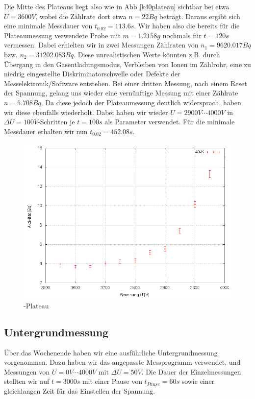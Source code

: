 Die Mitte des Plateaus liegt also wie in Abb \ref{k40plateau} sichtbar bei etwa $U = 3600V$, wobei die Zählrate dort etwa $n = 22 Bq$ beträgt. Daraus ergibt sich eine minimale Messdauer von $t_{0.02} = 113.6 s$. Wir haben also die bereits für die Plateaumessung verwendete Probe mit $m = 1.2158g$ nochmals für $t = 120s$ vermessen. Dabei erhielten wir in zwei Messungen Zählraten von $n_1 = 9620.017 Bq$ bzw. $n_2 = 31 202.083 Bq$. Diese unrealistischen Werte könnten z.B. durch Übergang in den Gasentladungsmodus, Verbleiben von Ionen im Zählrohr, eine zu niedrig eingestellte Diskriminatorschwelle oder Defekte der Messelektronik/Software entstehen. Bei einer dritten Messung, nach einem Reset der Spannung, gelang uns wieder eine vernünftige Messung mit einer Zählrate $n = 5.708 Bq$. Da diese jedoch der Plateaumessung deutlich widersprach, haben wir diese ebenfalls wiederholt. Dabei haben wir wieder $U = 2900V \cdots 4000V$ in $\Delta U = 100 V$-Schritten je $t=100s$ als Parameter verwendet. 
Für die minimale Messdauer erhalten wir nun $t_{0.02} = 452.08 s$.

\begin{figure}[H]
 \centering \includegraphics[width = 0.99\linewidth]{Messwerte/plots/K40_plateau2.png}
 \caption{-Plateau}
\end{figure}

\subsection{Untergrundmessung}
Über das Wochenende haben wir eine ausführliche Untergrundmessung vorgenommen. Dazu haben wir das angepasste Messprogramm verwendet, und Messungen von $U = 0V \cdots 4000V$ mit $\Delta U = 50V$. Die Dauer der Einzelmessungen stellten wir auf $t=3000s$ mit einer Pause von $t_{Pause} = 60 s$ sowie einer gleichlangen Zeit für das Einstellen der Spannung.

